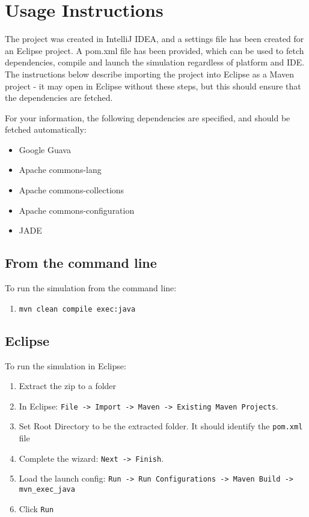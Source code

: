 \section{Usage Instructions}

The project was created in IntelliJ IDEA, and a settings file has been created
for an Eclipse project. A pom.xml file has been provided, which can be used
to fetch dependencies, compile and launch the simulation regardless of
platform and IDE\@. The instructions below describe importing the project into
Eclipse as a Maven project - it may open in Eclipse without these steps, but
this should ensure that the dependencies are fetched.

For your information, the following dependencies are specified, and should be
fetched automatically:

\begin{itemize}
  \item{Google Guava}
  \item{Apache commons-lang}
  \item{Apache commons-collections}
  \item{Apache commons-configuration}
  \item{JADE}
\end{itemize}

\subsection{From the command line}
To run the simulation from the command line:
\begin{enumerate}
\item{\verb!mvn clean compile exec:java!}
\end{enumerate}

\subsection{Eclipse}
To run the simulation in Eclipse:
\begin{enumerate}
\item{Extract the zip to a folder}
\item{In Eclipse: \verb!File -> Import -> Maven -> Existing Maven Projects!.}
\item{Set Root Directory to be the extracted folder. It should identify the
\verb!pom.xml! file}
\item{Complete the wizard: \verb!Next -> Finish!.}
\item{Load the launch config:
\verb!Run -> Run Configurations -> Maven Build -> mvn_exec_java!}
\item{Click \verb!Run!}
\end{enumerate}

